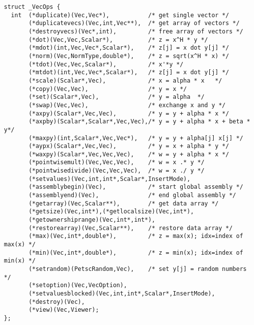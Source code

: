 \begin{verbatim}
struct _VecOps {
  int  (*duplicate)(Vec,Vec*),           /* get single vector */
       (*duplicatevecs)(Vec,int,Vec**),  /* get array of vectors */
       (*destroyvecs)(Vec*,int),         /* free array of vectors */
       (*dot)(Vec,Vec,Scalar*),          /* z = x^H * y */
       (*mdot)(int,Vec,Vec*,Scalar*),    /* z[j] = x dot y[j] */
       (*norm)(Vec,NormType,double*),    /* z = sqrt(x^H * x) */
       (*tdot)(Vec,Vec,Scalar*),         /* x'*y */
       (*mtdot)(int,Vec,Vec*,Scalar*),   /* z[j] = x dot y[j] */
       (*scale)(Scalar*,Vec),            /* x = alpha * x   */
       (*copy)(Vec,Vec),                 /* y = x */
       (*set)(Scalar*,Vec),              /* y = alpha  */
       (*swap)(Vec,Vec),                 /* exchange x and y */
       (*axpy)(Scalar*,Vec,Vec),         /* y = y + alpha * x */
       (*axpby)(Scalar*,Scalar*,Vec,Vec),/* y = y + alpha * x + beta * y*/
       (*maxpy)(int,Scalar*,Vec,Vec*),   /* y = y + alpha[j] x[j] */
       (*aypx)(Scalar*,Vec,Vec),         /* y = x + alpha * y */
       (*waxpy)(Scalar*,Vec,Vec,Vec),    /* w = y + alpha * x */
       (*pointwisemult)(Vec,Vec,Vec),    /* w = x .* y */
       (*pointwisedivide)(Vec,Vec,Vec),  /* w = x ./ y */
       (*setvalues)(Vec,int,int*,Scalar*,InsertMode),
       (*assemblybegin)(Vec),            /* start global assembly */
       (*assemblyend)(Vec),              /* end global assembly */
       (*getarray)(Vec,Scalar**),        /* get data array */
       (*getsize)(Vec,int*),(*getlocalsize)(Vec,int*),
       (*getownershiprange)(Vec,int*,int*),
       (*restorearray)(Vec,Scalar**),    /* restore data array */
       (*max)(Vec,int*,double*),         /* z = max(x); idx=index of max(x) */
       (*min)(Vec,int*,double*),         /* z = min(x); idx=index of min(x) */
       (*setrandom)(PetscRandom,Vec),    /* set y[j] = random numbers */
       (*setoption)(Vec,VecOption),
       (*setvaluesblocked)(Vec,int,int*,Scalar*,InsertMode),
       (*destroy)(Vec),
       (*view)(Vec,Viewer);
};


\end{verbatim}
